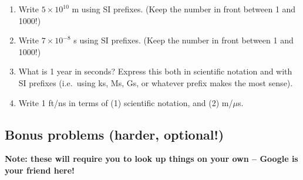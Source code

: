 \documentclass[12pt, letterpaper]{article}
\begin{document}
\begin{enumerate}
\item Write $5 \times 10^{10}$ m using SI prefixes.  (Keep the number in front between 1 and 1000!)

\answergrid{4.5cm}
\item Write $7 \times 10^{-8}$ s using SI prefixes.  (Keep the number in front between 1 and 1000!)
	
\answergrid{4.5cm}
\item What is 1 year in seconds?  Express this both in scientific notation and with SI prefixes (i.e.~using ks, Ms, Gs, or whatever prefix makes the most sense).

\answergrid{4.5cm}

\item Write 1 ft/ns in terms of (1) scientific notation, and (2) m/$\mu$s.

\answergrid{4.5cm}
%
%
%
%
%
%


%
\end{enumerate}

\subsection{Bonus problems (harder, optional!)}
\textbf{Note: these will require you to look up things on your own -- Google is your friend here!}
\end{document}
